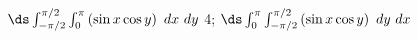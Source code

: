 {$\ds \int_{-\pi/2}^{\pi/2}\int_{0}^\pi\left(\sin x\cos y\right)\ dx\ dy$
}
{4; $\ds \int_{0}^\pi\int_{-\pi/2}^{\pi/2}\left(\sin x\cos y\right)\ dy\ dx$
}